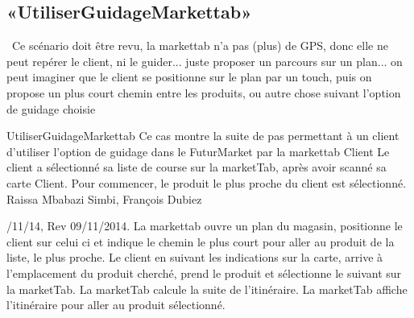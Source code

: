 \subsection{«UtiliserGuidageMarkettab»}
\TODO\ Ce scénario doit être revu, la markettab n'a pas (plus) de GPS, donc elle ne peut repérer le client, ni le guider... juste proposer un parcours sur un plan... on peut imaginer que le client se positionne sur le plan par un touch, puis on propose un plus court chemin entre les produits, ou autre chose suivant l'option de guidage choisie 

\startCU
\nom UtiliserGuidageMarkettab
\but Ce cas montre la suite de pas permettant à un client d'utiliser l'option de guidage dans le FuturMarket par la markettab
\acteur Client
\precondition Le client a sélectionné sa liste de course sur la marketTab, après avoir scanné sa carte Client. Pour commencer, le produit le plus proche du client est sélectionné.
\auteur Raissa Mbabazi Simbi, François Dubiez
\date 7/11/14, Rev 09/11/2014.
\nominal %
\startnominal
\etape[UGM:SA1] La markettab ouvre un plan du magasin, positionne le client sur celui ci et indique le chemin le plus court pour aller au produit de la liste, le plus proche.
 Le client en suivant les indications sur la carte, arrive à l'emplacement du produit cherché, prend le produit et sélectionne le suivant sur la marketTab.
\etape La marketTab calcule la suite de l'itinéraire.
\stopnominal
\postcondition La marketTab affiche l'itinéraire pour aller au produit sélectionné.

